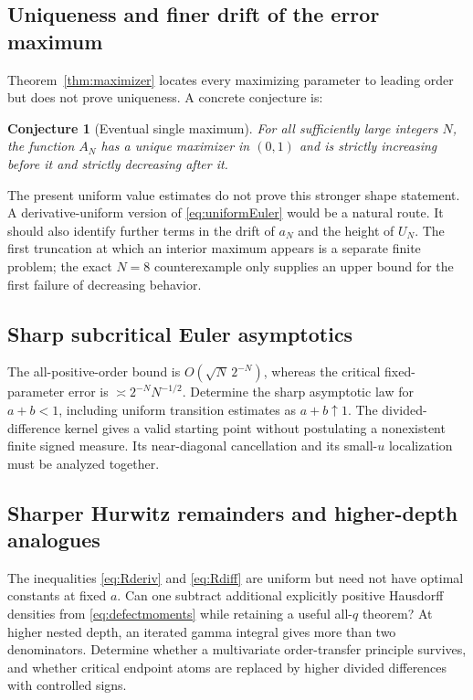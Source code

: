 \documentclass[11pt]{article}
\numberwithin{equation}{section}
\newtheorem{conjecture}[theorem]{Conjecture}
\theoremstyle{definition}\newtheorem{definition}[theorem]{Definition}
\theoremstyle{remark}\newtheorem{remark}[theorem]{Remark}
\begin{document}
\subsection{Uniqueness and finer drift of the error maximum}
Theorem~\ref{thm:maximizer} locates every maximizing parameter to
leading order but does not prove uniqueness. A concrete conjecture is:
\begin{conjecture}[Eventual single maximum]\label{conj:unimodal}
For all sufficiently large integers $N$, the function $A_N$ has a
unique maximizer in $(0,1)$ and is strictly increasing before it and
strictly decreasing after it.
\end{conjecture}
The present uniform value estimates do not prove this stronger
shape statement. A derivative-uniform version of
\eqref{eq:uniformEuler} would be a natural route. It should also
identify further terms in the drift of $a_N$ and the height of $U_N$.
The first truncation at which an interior maximum appears is a
separate finite problem; the exact $N=8$ counterexample only supplies
an upper bound for the first failure of decreasing behavior.

\subsection{Sharp subcritical Euler asymptotics}
The all-positive-order bound is $O(\sqrt N\,2^{-N})$, whereas the
critical fixed-parameter error is $\asymp2^{-N}N^{-1/2}$.
Determine the sharp asymptotic law for $a+b<1$, including uniform
transition estimates as $a+b\uparrow1$. The divided-difference
kernel gives a valid starting point without postulating a nonexistent
finite signed measure. Its near-diagonal cancellation and its
small-$u$ localization must be analyzed together.

\subsection{Sharper Hurwitz remainders and higher-depth analogues}
The inequalities \eqref{eq:Rderiv} and \eqref{eq:Rdiff} are uniform
but need not have optimal constants at fixed $a$. Can one subtract
additional explicitly positive Hausdorff densities from
\eqref{eq:defectmoments} while retaining a useful all-$q$ theorem?
At higher nested depth, an iterated gamma integral gives more than
two denominators. Determine whether a multivariate order-transfer
principle survives, and whether critical endpoint atoms are replaced
by higher divided differences with controlled signs.
\end{document}
